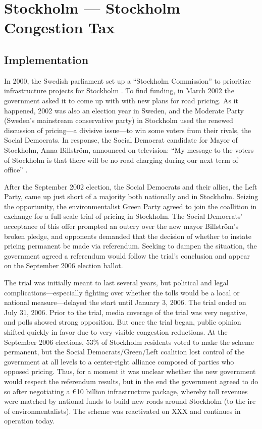 \section{Stockholm --- Stockholm Congestion Tax}

\subsection{Implementation}

In 2000, the Swedish parliament set up a ``Stockholm Commission'' to  prioritize infrastructure projects for Stockholm \citep{Eliasson2009b}. To find funding, in March 2002 the government asked it to come up with with new plans for road pricing. As it happened, 2002 was also an election year in Sweden, and the Moderate Party (Sweden's mainstream conservative party) in Stockholm used the renewed discussion of pricing---a divisive issue---to win some voters from their rivals, the Social Democrats. In response, the Social Democrat candidate for Mayor of Stockholm, Anna Billstr\"om, announced on television: ``My message to the voters of Stockholm is that there will be no road charging during our next term of office'' \citep{GullbergIsaksson2009}.

After the September 2002 election, the Social Democrats and their allies, the Left Party, came up just short of a majority both nationally and in Stockholm. Seizing the opportunity, the environmentalist Green Party agreed to join the coallition in exchange for a full-scale trial of pricing in Stockholm. The Social Democrats' acceptance of this offer prompted an outcry over the new mayor Billstr\"om's broken pledge, and opponents demanded that the decision of whether to instate pricing permanent be made via referendum. Seeking to dampen the situation, the government agreed a referendum would follow the trial's conclusion and appear on the September 2006 election ballot.

The trial was initially meant to last several years, but political and legal complications---especially fighting over whether the tolls would be a local or national measure---delayed the start until January 3, 2006. The trial ended on July 31, 2006. Prior to the trial, media coverage of the trial was very negative, and polls showed strong opposition. But once the trial began, public opinion shifted quickly in favor due to very visible congestion reductions. At the September 2006 elections, 53\% of Stockholm residents voted to make the scheme permanent, but the Social Democrats/Green/Left coalition lost control of the government at all levels to a center-right alliance composed of parties who opposed pricing. Thus, for a moment it was unclear whether the new government would respect the referendum results, but in the end the government agreed to do so after negotiating a \euro 10 billion infrastructure package, whereby toll revenues were matched by national funds to build new roads around Stockholm (to the ire of environmentalists). The scheme was reactivated on XXX and continues in operation today.

